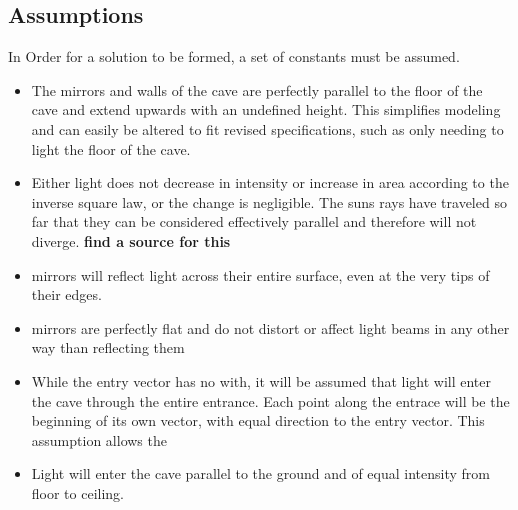 \documentclass[11pt, letterpaper]{article}
\begin{document}
\subsection{Assumptions} 
\par
In Order for a solution to be formed, a set of constants must be assumed.
\begin{itemize}
	\item The mirrors and walls of the cave are perfectly parallel to the floor of the cave and extend upwards with an undefined height. This simplifies modeling and can easily be altered to fit revised specifications, such as only needing to light the floor of the cave.
	

	\item Either light does not decrease in intensity or increase in area according to the inverse square law, or the change is negligible. The suns rays have traveled so far that they can be considered effectively parallel and therefore will not diverge. 
	\textbf{find a source for this}
		
	\item mirrors will reflect light across their entire surface, even at the very tips of their edges. 
	
	\item mirrors are perfectly flat and do not distort or affect light beams in any other way than reflecting them
	
	\item While the entry vector has no with, it will be assumed that light will enter the cave through the entire entrance. Each point along the entrace will be the beginning of its own vector, with equal direction to the entry vector. This assumption allows the 
	
		
	\item Light will enter the cave parallel to the ground and of equal intensity from floor to ceiling.
	

\end{itemize}
\end{document}
